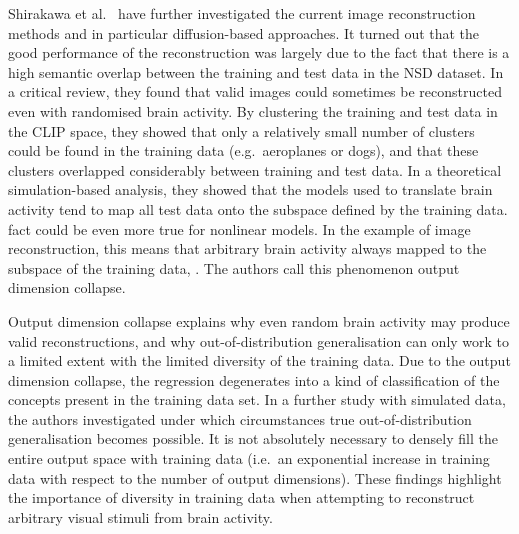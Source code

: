 Shirakawa et al.~\cite{shirakawaSpuriousReconstructionBrain2024} have further investigated the current image reconstruction methods and in particular diffusion-based approaches. It turned out that the good performance of the reconstruction was largely due to the fact that there is a high semantic overlap between the training and test data in the NSD dataset. In a critical review, they found that valid images could sometimes be reconstructed even with randomised brain activity. By clustering the training and test data in the CLIP space, they showed that only a relatively small number of clusters could be found in the training data (e.g.\ aeroplanes or dogs), and that these clusters overlapped considerably between training and test data. In a theoretical simulation-based analysis, they showed that the models used to translate brain activity tend to map all test data onto the subspace defined by the training data.  fact could be even more true for nonlinear  models. In the example of image reconstruction, this means that arbitrary brain activity  always mapped to the subspace of the training data, . The authors call this phenomenon output dimension collapse. 

Output dimension collapse explains why even random brain activity may produce valid reconstructions, and why out-of-distribution generalisation can only work to a limited extent with the limited diversity of the training data. Due to the  output dimension collapse, the regression degenerates into a kind of classification of the concepts present in the training data set. In a further study with simulated data, the authors investigated under which circumstances true out-of-distribution generalisation becomes possible.  It is not absolutely necessary to densely fill the entire output space with training data (i.e.\ an exponential increase in training data with respect to the number of output dimensions). These findings highlight the importance of diversity in training data when attempting to reconstruct arbitrary visual stimuli from brain activity.

